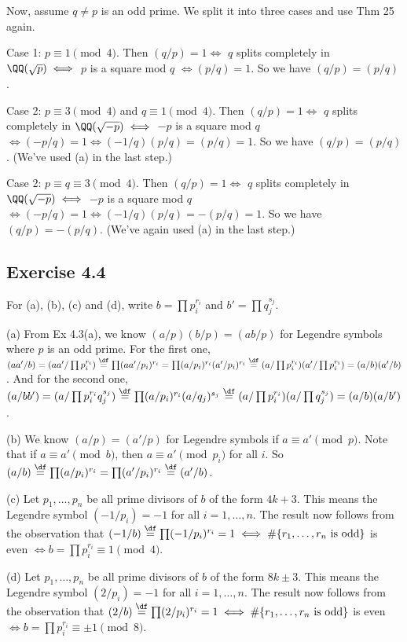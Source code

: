 \documentclass[../Chapter.tex]{subfiles}
\begin{document}
Now, assume $q\neq p$ is an odd prime. We split it into three cases and use Thm 25 again.

Case 1: $p\equiv 1\pmod{4}$. Then $(q/p)=1 \iff$ $q$ splits completely in $\QQ(\sqrt{p}) \iff$ $p$ is a square mod $q$ $\iff (p/q)=1$. So we have $(q/p)=(p/q)$.

Case 2: $p\equiv 3\pmod{4}$ and $q\equiv 1\pmod{4}$. Then $(q/p)=1 \iff$ $q$ splits completely in $\QQ(\sqrt{-p}) \iff$ $-p$ is a square mod $q$ $\iff (-p/q)=1 \iff (-1/q)(p/q)=(p/q)=1$. So we have $(q/p)=(p/q)$. (We've used (a) in the last step.)

Case 2: $p\equiv q \equiv3\pmod{4}$. Then $(q/p)=1 \iff$ $q$ splits completely in $\QQ(\sqrt{-p}) \iff$ $-p$ is a square mod $q$ $\iff (-p/q)=1 \iff (-1/q)(p/q)=-(p/q)=1$. So we have $(q/p)=-(p/q)$. (We've again used (a) in the last step.)

\subsection*{Exercise 4.4}

For (a), (b), (c) and (d), write $b=\prod p_i^{r_i}$ and $b'=\prod q_j^{s_j}$.

(a) From Ex 4.3(a), we know $(a/p)(b/p)=(ab/p)$ for Legendre symbols where $p$ is an odd prime. For the first one, $(aa'/b)=(aa'/\prod p_i^{r_i})\overset{\df}{=}\prod (aa'/p_i)^{r_i}=\prod (a/p_i)^{r_i}(a'/p_i)^{r_i}\overset{\df}{=}(a/\prod p_i^{r_i})(a'/\prod p_i^{r_i})=(a/b)(a'/b)$. And for the second one, $(a/bb')=(a/\prod p_i^{r_i}q_j^{s_j})\overset{\df}{=}\prod (a/p_i)^{r_i}(a/q_j)^{s_j}\overset{\df}{=}(a/\prod p_i^{r_i})(a/\prod q_j^{s_j})=(a/b)(a/b')$.

(b) We know $(a/p)=(a'/p)$ for Legendre symbols if $a\equiv a'\pmod{p}$. Note that if $a\equiv a'\pmod{b}$, then $a\equiv a'\pmod{p_i}$ for all $i$. So $(a/b)\overset{\df}{=}\prod (a/p_i)^{r_i}=\prod (a'/p_i)^{r_i}\overset{\df}{=}(a'/b)$.

(c) Let $p_1,\ldots,p_n$ be all prime divisors of $b$ of the form $4k+3$. This means the Legendre symbol $(-1/p_i)=-1$ for all $i=1,\ldots,n$. The result now follows from the observation that $(-1/b)\overset{\df}{=}\prod (-1/p_i)^{r_i}=1 \iff \#\{r_1,\ldots,r_n \text{ is odd}\}$ is even $\iff b=\prod p_i^{r_i}\equiv 1\pmod{4}$.

(d) Let $p_1,\ldots,p_n$ be all prime divisors of $b$ of the form $8k\pm3$. This means the Legendre symbol $(2/p_i)=-1$ for all $i=1,\ldots,n$. The result now follows from the observation that $(2/b)\overset{\df}{=}\prod (2/p_i)^{r_i}=1 \iff \#\{r_1,\ldots,r_n \text{ is odd}\}$ is even $\iff b=\prod p_i^{r_i}\equiv \pm1\pmod{8}$.
\end{document}
